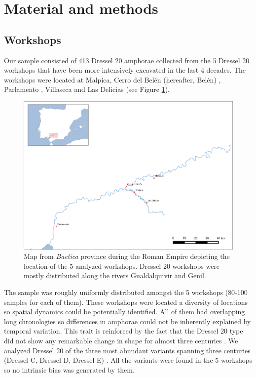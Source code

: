 \documentclass[review]{elsarticle}
\begin{document}
\section{Material and methods}

\subsection{Workshops}

Our sample consisted of 413 Dressel 20 amphorae collected from the 5 Dressel 20 workshops that have been more intensively excavated in the last 4 decades. The workshops were located at Malpica, Cerro del Belén (hereafter, Belén) \citep{diaz_trujillo_excavacion_1992}, Parlamento \citep{garcia_vargas_anforas_2000}, Villaseca\citep{garcia_vargas_enrique_excavacion_????} and Las Delicias \citep{fernandez_excavacion_2001,_atelier_2014} (see Figure \ref{romanworkshop}).

\begin{figure}[htp]
	\centering
\includegraphics[width=\linewidth]{figs/romanworkshop}
\caption{Map from \textit{Baetica} province during the Roman Empire depicting the location of the 5 analyzed workshops. Dressel 20 workshops were mostly distributed along the rivers Gualdalquivir and Genil.}
\label{romanworkshop}
\end{figure} 

The sample was roughly uniformly distributed amongst the 5 workshops (80-100 samples for each of them). These workshops were located a diversity of locations so spatial dynamics could be potentially identified. All of them had overlapping long chronologies so differences in amphorae could not be inherently explained by temporal variation. This trait is reinforced by the fact that the Dressel 20 type did not show any remarkable change in shape for almost three centuries \citep{berni_dressel_2016}. We analyzed Dressel 20 of the three most abundant variants spanning three centuries (Dressel C, Dressel D, Dressel E) \citep{berni_millet_epigrafianforica_2008,martin-kilcher_romischen_1994}. All the variants were found in the 5 workshops so no intrinsic bias was generated by them.
\end{document}
